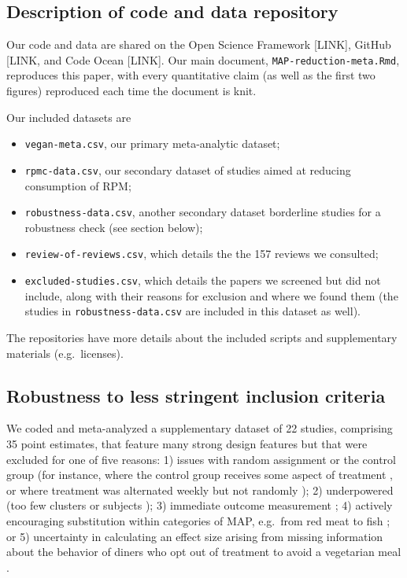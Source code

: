 \documentclass[sn-nature,referee,pdflatex]{sn-jnl}
\begin{document}
\subsection{Description of code and data
repository}\label{description-of-code-and-data-repository}

Our code and data are shared on the Open Science Framework {[}LINK{]},
GitHub {[}LINK, and Code Ocean {[}LINK{]}. Our main document,
\texttt{MAP-reduction-meta.Rmd}, reproduces this paper, with every
quantitative claim (as well as the first two figures) reproduced each
time the document is knit.

Our included datasets are

\begin{itemize}
\item
  \texttt{vegan-meta.csv}, our primary meta-analytic dataset;
\item
  \texttt{rpmc-data.csv}, our secondary dataset of studies aimed at
  reducing consumption of RPM;
\item
  \texttt{robustness-data.csv}, another secondary dataset borderline
  studies for a robustness check (see section below);
\item
  \texttt{review-of-reviews.csv}, which details the the 157 reviews we
  consulted;
\item
  \texttt{excluded-studies.csv}, which details the papers we screened
  but did not include, along with their reasons for exclusion and where
  we found them (the studies in \texttt{robustness-data.csv} are
  included in this dataset as well).
\end{itemize}

The repositories have more details about the included scripts and
supplementary materials (e.g.~licenses).

\subsection{Robustness to less stringent inclusion
criteria}\label{Sec5.1.1}

We coded and meta-analyzed a supplementary dataset of 22 studies,
comprising 35 point estimates, that feature many strong design features
but that were excluded for one of five reasons: 1) issues with random
assignment or the control group (for instance, where the control group
receives some aspect of treatment \citep{piazza2022}, or where treatment
was alternated weekly but not randomly \citep{garnett2020}); 2)
underpowered (too few clusters \citep{reinders2017} or subjects
\citep{lentz2019}); 3) immediate outcome measurement
\citep{dannenberg2023, sparkman2017, griesoph2021, hansen2021}; 4)
actively encouraging substitution within categories of MAP, e.g.~from
red meat to fish \citep{celis2017, johansen2009}; or 5) uncertainty in
calculating an effect size arising from missing information about the
behavior of diners who opt out of treatment to avoid a vegetarian meal
\citep{betterfoodfoundation2023}.
\end{document}
